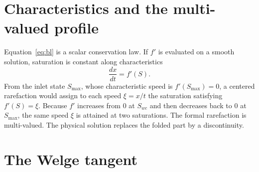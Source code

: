 \documentclass[11pt]{article}
\begin{document}
\section{Characteristics and the multi-valued profile}

Equation~\eqref{eq:bl} is a scalar conservation law.
If $f'$ is evaluated on a smooth solution, saturation is constant along characteristics
\begin{equation}
\label{eq:char}
\frac{dx}{dt} = f'(S).
\end{equation}
From the inlet state $S_{\max}$, whose characteristic speed is $f'(S_{\max}) = 0$, a centered rarefaction would assign to each speed $\xi = x/t$ the saturation satisfying $f'(S) = \xi$.
Because $f'$ increases from $0$ at $S_{wc}$ and then decreases back to $0$ at $S_{\max}$, the same speed $\xi$ is attained at two saturations.
The formal rarefaction is multi-valued.
The physical solution replaces the folded part by a discontinuity.

\section{The Welge tangent}
\end{document}
